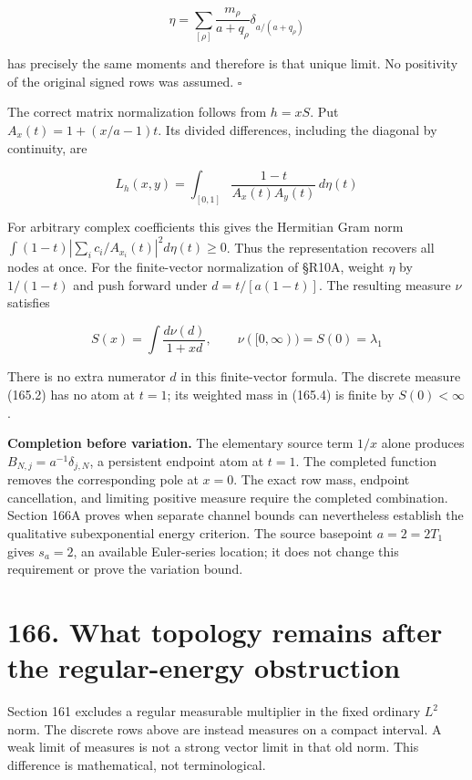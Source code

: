 \documentclass[
  11pt,
]{book}
\begin{document}
\[
\eta=\sum_{[\rho]}\frac{m_\rho}{a+q_\rho}
\delta_{a/(a+q_\rho)}
\tag{165.2}
\]

has precisely the same moments and therefore is that unique limit. No
positivity of the original signed rows was assumed. \(\square\)

The correct matrix normalization follows from \(h=xS\). Put
\(A_x(t)=1+(x/a-1)t\). Its divided differences, including the diagonal
by continuity, are

\[
L_h(x,y)=\int_{[0,1]}\frac{1-t}{A_x(t)A_y(t)}\,d\eta(t)
\tag{165.3}
\]

For arbitrary complex coefficients this gives the Hermitian Gram norm
\(\int(1-t)|\sum_i c_i/A_{x_i}(t)|^2d\eta(t)\ge0\). Thus the
representation recovers all nodes at once. For the finite-vector
normalization of §R10A, weight \(\eta\) by \(1/(1-t)\) and push forward
under \(d=t/[a(1-t)]\). The resulting measure \(\nu\) satisfies

\[
S(x)=\int\frac{d\nu(d)}{1+xd},\qquad
\nu([0,\infty))=S(0)=\lambda_1
\tag{165.4}
\]

There is no extra numerator \(d\) in this finite-vector formula. The
discrete measure (165.2) has no atom at \(t=1\); its weighted mass in
(165.4) is finite by \(S(0)<\infty\).

\textbf{Completion before variation.} The elementary source term \(1/x\)
alone produces \(B_{N,j}=a^{-1}\delta_{j,N}\), a persistent endpoint
atom at \(t=1\). The completed function removes the corresponding pole
at \(x=0\). The exact row mass, endpoint cancellation, and limiting
positive measure require the completed combination. Section 166A proves
when separate channel bounds can nevertheless establish the qualitative
subexponential energy criterion. The source basepoint \(a=2=2T_1\) gives
\(s_a=2\), an available Euler-series location; it does not change this
requirement or prove the variation bound.

\section{166. What topology remains after the regular-energy
obstruction}\label{what-topology-remains-after-the-regular-energy-obstruction}

Section 161 excludes a regular measurable multiplier in the fixed
ordinary \(L^2\) norm. The discrete rows above are instead measures on a
compact interval. A weak limit of measures is not a strong vector limit
in that old norm. This difference is mathematical, not terminological.
\end{document}
